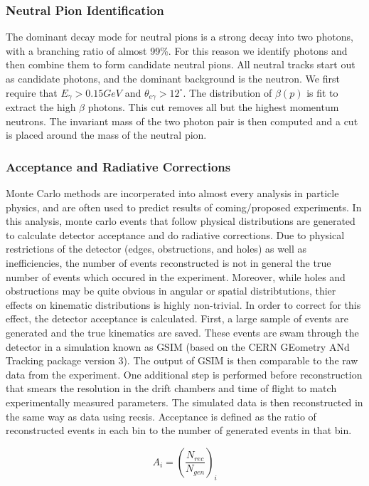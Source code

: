 \subsubsection{Neutral Pion Identification}
The dominant decay mode for neutral pions is a strong decay into two photons, with a branching ratio of almost 99\%.  For this reason we identify photons and then combine them to form candidate neutral pions.  All neutral tracks start out as candidate photons, and the dominant background is the neutron. We first require that $E_{\gamma} > 0.15 GeV$ and $\theta_{e\gamma} > 12^{\circ}$. The distribution of $\beta(p)$ is fit to extract the high $\beta$ photons. This cut removes all but the highest momentum neutrons.  The invariant mass of the two photon pair is then computed and a cut is placed around the mass of the neutral pion.  

\subsubsection{Acceptance and Radiative Corrections}
Monte Carlo methods are incorperated into almost every analysis in particle physics, and are often used to predict results of coming/proposed experiments.  In this analysis, monte carlo events that follow physical distributions are generated to calculate detector acceptance and do radiative corrections.  Due to physical restrictions of the detector (edges, obstructions, and holes) as well as inefficiencies, the number of events reconstructed is not in general the true number of events which occured in the experiment.  Moreover, while holes and obstructions may be quite obvious in angular or spatial distribtutions, thier effects on kinematic distributions is highly non-trivial.  In order to correct for this effect, the detector acceptance is calculated.  First, a large sample of events are generated and the true kinematics are saved.  These events are swam through the detector in a simulation known as GSIM (based on the CERN GEometry ANd Tracking package version 3).  The output of GSIM is then comparable to the raw data from the experiment.  One additional step is performed before reconstruction that smears the resolution in the drift chambers and time of flight to match experimentally measured parameters.  The simulated data is then reconstructed in the same way as data using recsis.  Acceptance is defined as the ratio of reconstructed events in each bin to the number of generated events in that bin.

\begin{equation}
  A_{i} = \left( \frac{N_{rec}}{N_{gen}} \right)_{i}
\end{equation}

